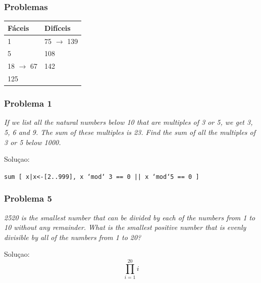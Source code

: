 \documentclass{beamer}
\begin{document}
\begin{frame}
    \frametitle{Problemas}
    \begin{table}[htpb]
        \centering
        \begin{tabular}{l | l}
            Fáceis               & Difíceis              \\ \hline
            1                    & 75 $\rightarrow$ 139  \\
            5                    & 108                   \\
            18 $\rightarrow$ 67  & 142                   \\
            125                  & \\
        \end{tabular}
    \end{table}
\end{frame}

\begin{frame}
    \frametitle{Problema 1}
    \begin{center}
        \textit{
            If we list all the natural numbers below 10 that are multiples of 3 or 5, we get 3, 5, 6 and 9. The sum of these multiples is 23.
            Find the sum of all the multiples of 3 or 5 below 1000.
        }
    \end{center}

    Soluçao:
    \begin{center}
        \texttt{sum [ x|x<-[2..999], x `mod` 3 == 0 || x `mod`5 == 0 ]}
    \end{center}

\end{frame}

\begin{frame}
    \frametitle{Problema 5}

    \begin{center}
        \textit{
            2520 is the smallest number that can be divided by each of the numbers from 1 to 10 without any remainder.
            What is the smallest positive number that is evenly divisible by all of the numbers from 1 to 20?
        }
    \end{center}

    Soluçao:
    \begin{equation}
        \prod_{i=1}^{20} i
    \end{equation}
\end{frame}
\end{document}

